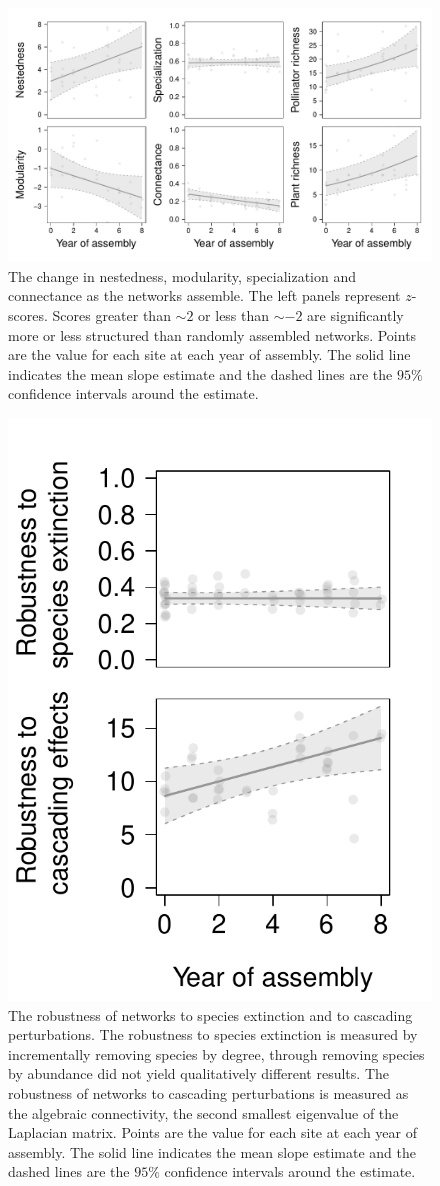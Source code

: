\documentclass[12pt]{article}
\begin{document}
\begin{figure}
  \centering
  \includegraphics[width=1\textwidth]{../analysis/networkLevel/figures/baci.pdf}
  \caption{The change in nestedness, modularity, specialization and
    connectance as the networks assemble. The left panels represent
    $z$-scores. Scores greater than $\sim 2$ or less than $\sim -2$
    are significantly more or less structured than randomly assembled
    networks. Points are the value for each site at each year of
    assembly. The solid line indicates the mean slope estimate and the
    dashed lines are the $95\%$ confidence intervals around the
    estimate.}
  \label{fig:baci}
\end{figure}
\clearpage


\begin{figure}
  \centering
  \includegraphics[width=.5\textwidth]{../analysis/networkLevel/figures/robustness.pdf}
  \caption{The robustness of networks to species extinction and
    to cascading perturbations. The robustness to species extinction is measured by
    incrementally removing species by degree, through removing species
    by abundance did not yield qualitatively different results. The robustness of networks to cascading perturbations is measured as the algebraic connectivity, the second smallest eigenvalue of the Laplacian matrix. Points
    are the value for each site at each year of assembly. The solid
    line indicates the mean slope estimate and the dashed lines are
    the $95\%$ confidence intervals around the estimate.}
  \label{fig:rob}
\end{figure}
\clearpage
\end{document}
